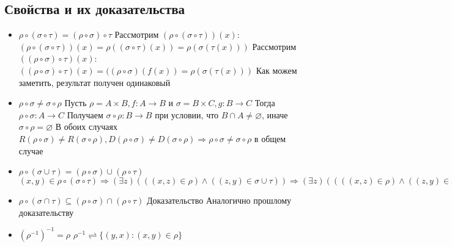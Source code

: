 \documentclass{report}
\begin{document}
\subsection{Свойства и их доказательства}
\begin{itemize}
	\item $\rho \circ (\sigma \circ \tau) = (\rho \circ \sigma) \circ \tau$\newline
	      Рассмотрим $(\rho \circ (\sigma \circ \tau))(x)$: $(\rho \circ (\sigma \circ \tau))(x) = \rho((\sigma \circ \tau)(x)) = \rho(\sigma(\tau(x)))$\newline
	      Рассмотрим $((\rho \circ \sigma) \circ \tau)(x)$: $((\rho \circ \sigma) \circ \tau)(x) = ((\rho \circ \sigma)(f(x)) = \rho(\sigma(\tau(x)))$\newline
	      Как можем заметить, результат получен одинаковый
	\item $\rho \circ \sigma \neq \sigma \circ \rho$\newline
	      Пусть $\rho = A \times B, f: A \rightarrow B$ и $\sigma = B \times C, g: B \rightarrow C$\newline
	      Тогда $\rho \circ \sigma: A \rightarrow C$\newline
	      Получаем $\sigma \circ \rho: B \rightarrow B$ при условии, что $B \cap A \neq \varnothing$, иначе $\sigma \circ \rho = \varnothing$\newline
	      В обоих случаях $R(\rho \circ \sigma) \neq R(\sigma \circ \rho),
		      D(\rho \circ \sigma) \neq D(\sigma \circ \rho) \Rightarrow
		      \rho \circ \sigma \neq \sigma \circ \rho$ в общем случае
	\item $\rho \circ (\sigma \cup \tau) = (\rho \circ \sigma) \cup (\rho \circ \tau)$\newline
	      $(x,y) \in \rho \circ (\sigma \circ \tau) \Rightarrow
		      (\exists z)(((x,z) \in \rho) \land ((z,y) \in \sigma \cup \tau)) \Rightarrow
		      (\exists z)((((x,z) \in \rho) \land ((z,y) \in \sigma) \lor ((z,y) \in \tau))) \Rightarrow
		      (\exists u)(((x,u) \in \rho) \land ((u,y) \in \sigma) \lor (\exists v)((x,v) \in \rho \land (v,y) \in \tau)) \Rightarrow
		      (\rho \circ \sigma) \cup \rho \circ \tau$
	\item  $\rho \circ (\sigma \cap \tau) \subseteq (\rho \circ \sigma) \cap (\rho \circ \tau)$\newline
	      Доказательство Аналогично прошлому доказательству
	\item $(\rho^{-1})^{-1} = \rho$\newline
	      $\rho^{-1} \rightleftharpoons \{(y,x): (x,y) \in \rho\}$\newline

\end{itemize}
\end{document}
